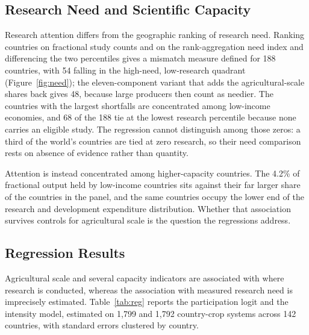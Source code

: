 \documentclass[ASNA,twocolumn]{USG}
\begin{document}
\subsection{Research Need and Scientific Capacity}

Research attention differs from the geographic ranking of research need.
Ranking countries on fractional study counts and on the rank-aggregation need index and
differencing the two percentiles gives a mismatch measure defined for 188 countries, with 54
falling in the high-need, low-research quadrant (Figure~\ref{fig:need}); the eleven-component
variant that adds the agricultural-scale shares back gives 48, because large producers then count
as needier.  The countries with the largest shortfalls are concentrated
among low-income economies, and 68 of the 188 tie at the lowest research percentile because none carries an eligible study. The regression cannot distinguish among those zeros: a third of the world's countries are tied at
zero research, so their need comparison rests on absence of evidence rather than quantity.

Attention is instead concentrated among higher-capacity countries. The 4.2\% of fractional
output held by low-income countries sits against their far larger share of the countries in
the panel, and the same countries occupy the lower end of the research and development
expenditure distribution. Whether that association survives controls for agricultural scale is
the question the regressions address.

\subsection{Regression Results}\label{sec:reg}

Agricultural scale and several capacity indicators are associated with where research is
conducted, whereas the association with measured research need is imprecisely estimated.
Table~\ref{tab:reg} reports the participation logit and the intensity model, estimated on
1,799 and 1,792 country-crop systems across 142 countries, with standard errors clustered by
country.
\end{document}
